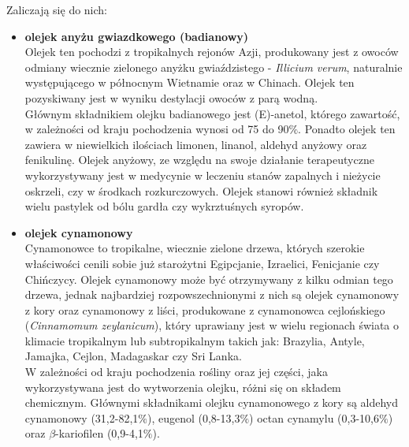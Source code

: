 \documentclass[11pt,a4paper]{report}
\begin{document}
Zaliczają się do nich:
\begin{itemize}
\item \textbf{olejek anyżu gwiazdkowego (badianowy)}\\
Olejek ten pochodzi z tropikalnych rejonów Azji, produkowany jest z owoców odmiany wiecznie zielonego anyżku gwiaździstego - \textit{Illicium verum}, naturalnie występującego w północnym Wietnamie oraz w Chinach\cite{polenna_a}. Olejek ten pozyskiwany jest w wyniku destylacji owoców z parą wodną\cite{pollena_a, lis}.\\
Głównym składnikiem olejku badianowego jest (E)-anetol, którego zawartość, w zależności od kraju pochodzenia wynosi od 75 do 90$\%$. Ponadto 
olejek ten zawiera w niewielkich ilościach limonen, linanol, aldehyd anyżowy oraz fenikulinę\cite{lis, Lawrence}. Olejek anyżowy, ze względu na swoje działanie terapeutyczne wykorzystywany jest w medycynie w leczeniu stanów zapalnych i nieżycie oskrzeli, czy w środkach rozkurczowych. Olejek stanowi również składnik wielu pastylek od bólu gardła czy wykrztuśnych syropów\cite{lis, deido}.

\item \textbf{olejek cynamonowy}\\
Cynamonowce to tropikalne, wiecznie zielone drzewa, których szerokie właściwości cenili sobie już starożytni Egipcjanie, Izraelici, Fenicjanie czy Chińczycy. Olejek cynamonowy może być otrzymywany z kilku odmian tego drzewa, jednak najbardziej rozpowszechnionymi z nich są olejek cynamonowy z kory oraz cynamonowy z liści, produkowane z cynamonowca cejlońskiego (\textit{Cinnamomum zeylanicum}), który uprawiany jest w wielu regionach świata o klimacie tropikalnym lub subtropikalnym takich jak: Brazylia, Antyle, Jamajka, Cejlon, Madagaskar czy Sri Lanka\cite{pollena_c, gorailis}.\\
W zależności od kraju pochodzenia rośliny oraz jej części, jaka wykorzystywana jest do wytworzenia olejku, różni się on składem chemicznym. Głównymi składnikami olejku cynamonowego z kory są aldehyd cynamonowy (31,2-82,1$\%$), eugenol (0,8-13,3$\%$) octan cynamylu (0,3-10,6$\%$) oraz  $\beta$-kariofilen (0,9-4,1$\%$)\cite{gorailis, kedzia2012}.


\end{itemize}
\end{document}
